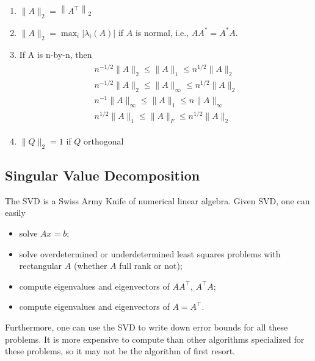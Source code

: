 \documentclass[11pt]{article}
\numberwithin{equation}{section}
\begin{document}
\begin{lemma}
\begin{enumerate}
\begin{proof}
\begin{align*}
                &\leq \sqrt{\max _{y \neq 0} \frac{\lambda_{\mathrm{max}} \sum y_i^2}{\sum y_i^2}} \\
            \end{align*}
        \end{proof}
        \item $\|A\|_{2}=\left\|A^{\top}\right\|_{2}$
        \item $\|A\|_{2}=\max _{i}\left|\lambda_{i}(A)\right|$ if $A$ is normal, i.e., $A A^{*}=A^{*} A$.
        \item If A is n-by-n, then \begin{align*}
            \begin{array}{l}
                n^{-1 / 2}\|A\|_{2} \leq\|A\|_{1} \leq n^{1 / 2}\|A\|_{2} \\
                n^{-1 / 2}\|A\|_{2} \leq\|A\|_{\infty} \leq n^{1 / 2}\|A\|_{2} \\
                n^{-1}\|A\|_{\infty} \leq\|A\|_{1} \leq n\|A\|_{\infty} \\
                n^{1 / 2}\|A\|_{1} \leq\|A\|_{F} \leq n^{1 / 2}\|A\|_{2}
            \end{array}
        \end{align*}
        \item $\|Q\|_{2}=1$ if $Q$ orthogonal
    \end{enumerate}
\end{lemma}

\subsection{Singular Value Decomposition}
The SVD is a Swiss Army Knife of numerical linear algebra. Given SVD, one can easily \begin{itemize}
    \item solve $Ax=b$;
    \item solve overdetermined or underdetermined least squares problems with rectangular $A$ (whether $A$ full rank or not);
    \item compute eigenvalues and eigenvectors of $AA^\top $, $A^\top A$;
    \item compute eigenvalues and eigenvectors of $A=A^\top$.
\end{itemize}   
Furthermore, one can use the SVD to write down error bounds for all these problems. It is more expensive to compute than other algorithms specialized for these problems, 
so it may not be the algorithm of first resort.
\end{document}

